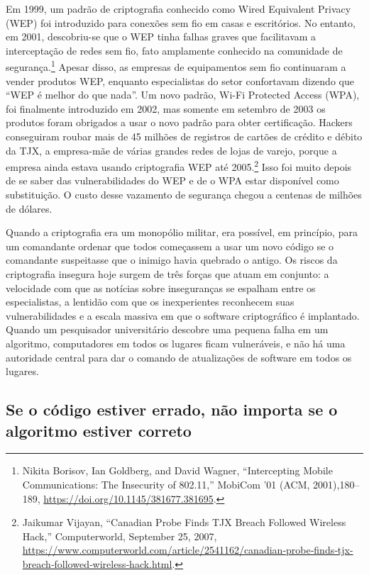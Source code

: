 \documentclass{book}
\begin{document}
Em 1999, um padrão de criptografia conhecido como Wired Equivalent Privacy (WEP) foi introduzido para conexões sem fio em casas e escritórios. No entanto, em 2001, descobriu-se que o WEP tinha falhas graves que facilitavam a interceptação de redes sem fio, fato amplamente conhecido na comunidade de segurança.\footnote{Nikita Borisov, Ian Goldberg, and David Wagner, “Intercepting Mobile Communications: The Insecurity of 802.11,” MobiCom ’01 (ACM, 2001),180–189, \url{https://doi.org/10.1145/381677.381695}.} Apesar disso, as empresas de equipamentos sem fio continuaram a vender produtos WEP, enquanto especialistas do setor confortavam dizendo que ``WEP é melhor do que nada''. Um novo padrão, Wi-Fi Protected Access (WPA), foi finalmente introduzido em 2002, mas somente em setembro de 2003 os produtos foram obrigados a usar o novo padrão para obter certificação. Hackers conseguiram roubar mais de 45 milhões de registros de cartões de crédito e débito da TJX, a empresa-mãe de várias grandes redes de lojas de varejo, porque a empresa ainda estava usando criptografia WEP até 2005.\footnote{Jaikumar Vijayan, “Canadian Probe Finds TJX Breach Followed Wireless Hack,” Computerworld, September 25, 2007, \url{https://www.computerworld.com/article/2541162/canadian‐probe‐finds‐tjx-breach‐followed‐wireless‐hack.html}.} Isso foi muito depois de se saber das vulnerabilidades do WEP e de o WPA estar disponível como substituição. O custo desse vazamento de segurança chegou a centenas de milhões de dólares.

Quando a criptografia era um monopólio militar, era possível, em princípio, para um comandante ordenar que todos começassem a usar um novo código se o comandante suspeitasse que o inimigo havia quebrado o antigo. Os riscos da criptografia insegura hoje surgem de três forças que atuam em conjunto: a velocidade com que as notícias sobre inseguranças se espalham entre os especialistas, a lentidão com que os inexperientes reconhecem suas vulnerabilidades e a escala massiva em que o software criptográfico é implantado. Quando um pesquisador universitário descobre uma pequena falha em um algoritmo, computadores em todos os lugares ficam vulneráveis, e não há uma autoridade central para dar o comando de atualizações de software em todos os lugares.


\subsection{Se o código estiver errado, não importa se o algoritmo estiver correto}
\label{segredos:errado}
\end{document}
